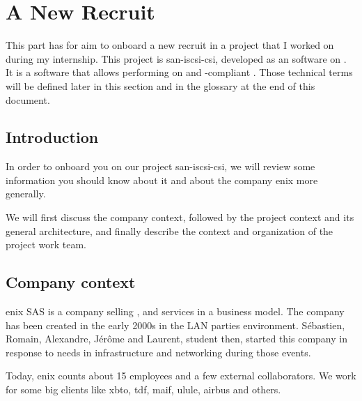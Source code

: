 \chapter{A New Recruit}


This part has for aim to onboard a new recruit in a project that I worked on during my internship. This project is \gls{san-iscsi-csi}, developed as an  software on . It is a software that allows performing  on  and -compliant . Those technical terms will be defined later in this section and in the glossary at the end of this document.

\clearpage
\blankpage

\section{Introduction}

In order to onboard you on our project \gls{san-iscsi-csi}, we will review some information you should know about it and about the company \gls{enix} more generally.

We will first discuss the company context, followed by the project context and its general architecture, and finally describe the context and organization of the project work team.

\section{Company context}

\gls{enix} SAS is a company selling ,  and  services in a  business model. The company has been created in the early 2000s in the LAN parties environment. Sébastien, Romain, Alexandre, Jérôme and Laurent, student then, started this company in response to needs in infrastructure and networking during those events.

Today, \gls{enix} counts about 15 employees and a few external collaborators. We work for some big clients like \gls{xbto}, \gls{tdf}, \gls{maif}, \gls{ulule}, \gls{airbus} and others.

